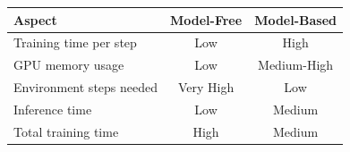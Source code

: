 \begin{table}
\centering


\begin{tabular}{@{}lcc@{}}
\toprule
\textbf{Aspect} & \textbf{Model-Free} & \textbf{Model-Based} \\
\midrule
Training time per step & Low & High \\
GPU memory usage & Low & Medium-High \\
Environment steps needed & Very High & Low \\
Inference time & Low & Medium \\
Total training time & High & Medium \\
\bottomrule
\end{tabular}
\end{table}